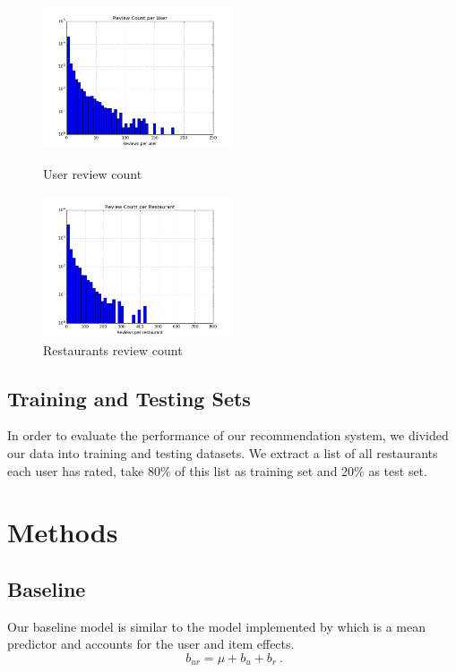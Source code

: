 \documentclass{llncs}
\begin{document}
\begin{figure}
	\begin{minipage}[t]{0.5\textwidth}
		\centering
		\includegraphics[width=2.2in]{fig1.png}
		\caption{User review count}
		\label{fig:side:a}
	\end{minipage}%
	\begin{minipage}[t]{0.5\textwidth}
		\centering
		\includegraphics[width=2.2in]{fig2.png}
		\caption{Restaurants review count}
		\label{fig:side:b}
	\end{minipage}
\end{figure}

\subsection{Training and Testing Sets}
%
In order to evaluate the performance of our recommendation system, we divided our data into training and testing datasets. We extract a list of all restaurants each user has rated, take 80\% of this list as training set and 20\% as test set. 

\section{Methods}
\subsection{Baseline}
Our baseline model is similar to the model implemented by\cite{Yehuda} which is a mean predictor and accounts for the user and item effects. 
\begin{equation}
\ b_{ur} = \mu + b_u + b_r \ .
\end{equation}
\end{document}
